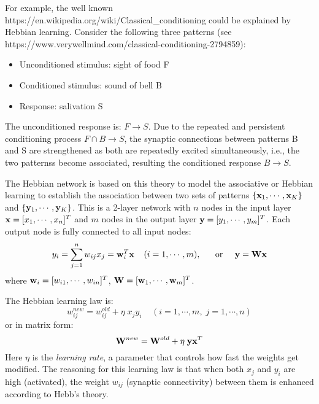 \documentclass{article}
\begin{document}
For example, the well known 
{https://en.wikipedia.org/wiki/Classical_conditioning} could be 
explained by Hebbian learning. Consider the following three patterns
(see 
{https://www.verywellmind.com/classical-conditioning-2794859}):
\begin{itemize}
\item Unconditioned stimulus: sight of food F
\item Conditioned stimulus: sound of bell B
\item Response: salivation S 
\end{itemize}
The unconditioned response is: $F \rightarrow S$. Due to the repeated
and persistent conditioning process $F \cap B \rightarrow S$, the 
synaptic connections between patterns B and S are strengthened as both
are repeatedly excited simultaneously, i.e., the two patternss become 
associated, resulting the conditioned response $B \rightarrow S$.

The Hebbian network is based on this theory to model the associative 
or Hebbian learning to establish the association between two sets of 
patterns $\{{\bf x}_1,\cdots,{\bf x}_K \}$ and $\{{\bf y}_1,\cdots,{\bf y}_K\}$.
This is a 2-layer network with $n$ nodes in the input layer 
${\bf x}=[x_1,\cdots,x_n]^T$ and $m$ nodes in the output layer 
${\bf y}=[y_1,\cdots,y_m]^T$. Each output node is fully connected to 
all input nodes:
\begin{equation}
y_i=\sum_{j=1}^n w_{ij} x_j={\bf w}_i^T{\bf x}\;\;\;\;(i=1,\cdots,m),
\;\;\;\;\;\;\mbox{or}\;\;\;\;\;	{\bf y}={\bf W}{\bf x}
\end{equation}
where ${\bf w}_i=[w_{i1},\cdots,w_{in}]^T$, 
${\bf W}=[{\bf w}_1,\cdots,{\bf w}_m]^T$.


The Hebbian learning law is:
\begin{equation}
w_{ij}^{new}=w_{ij}^{old}+\eta\;x_j y_i\;\;\;\;(i=1,\cdots,m,\;j=1,\cdots,n)
\end{equation}
or in matrix form:
\begin{equation}
  {\bf W}^{new}={\bf W}^{old}+\eta\; {\bf y} {\bf x}^T	
\end{equation}
Here $\eta$ is the {\em learning rate}, a parameter that controls how fast 
the weights get modified. The reasoning for this learning law is that when 
both $x_j$ and $y_i$ are high (activated), the weight $w_{ij}$ (synaptic 
connectivity) between them is enhanced according to Hebb's theory.
\end{document}
